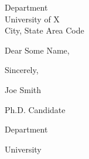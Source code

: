 \documentclass{letter}
\begin{document}
%

\begin{letter}{Department  \\ University of X\\ City, State Area Code}%

\opening{Dear Some Name,}

\lipsum


\vfill

Sincerely,

\vfill

Joe Smith

Ph.D. Candidate

Department 

University 
\end{letter}
\end{document}
